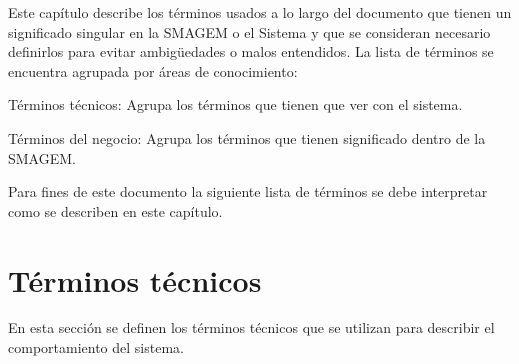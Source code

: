\label{sec:glosario}
    Este capítulo describe los términos usados a lo largo del documento que tienen un significado singular en la SMAGEM o el Sistema y que se consideran necesario definirlos para evitar ambigüedades o malos entendidos.
    La lista de términos se encuentra agrupada por áreas de conocimiento:
\begin{Citemize}
    \item Términos técnicos: Agrupa los términos que tienen que ver con el sistema.
    \item Términos del negocio: Agrupa los términos que tienen significado dentro de la SMAGEM.
\end{Citemize}

    Para fines de este documento la siguiente lista de términos se debe interpretar como se describen en este capítulo.

   
\section{Términos técnicos}
\label{gls:terminosTecnicos}

  En esta sección se definen los términos técnicos que se utilizan para describir el comportamiento del sistema.
  
